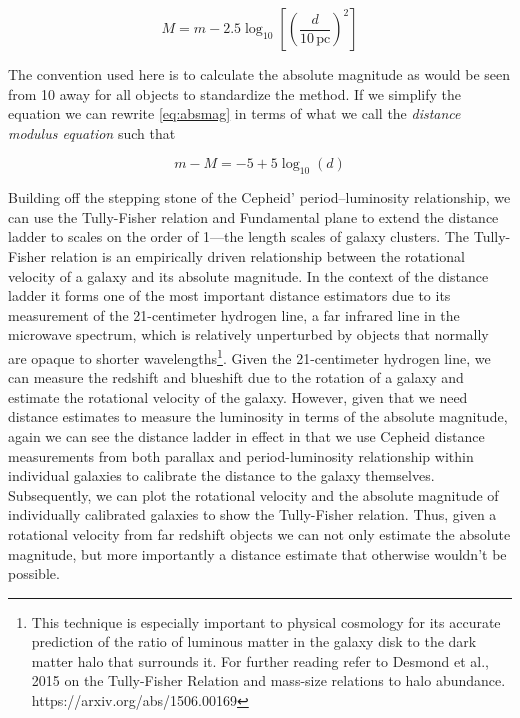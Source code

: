 \begin{equation}M = m - 2.5 \log_{10} \left[ \left( \frac{d}{10\, \text{pc}} \right)^2 \right] \label{eq:absmag}\end{equation}

The convention used here is to calculate the absolute magnitude as would
be seen from 10\si{\parsec} away for all objects to standardize the
method. If we simplify the equation we can rewrite
\cref{eq:absmag} in terms of what we call the
\emph{distance modulus equation} such that

\begin{equation}m - M = -5 + 5  \log_{10} (d)\label{eq:distmod}\end{equation}

Building off the stepping stone of the Cepheid' period--luminosity
relationship, we can use the Tully-Fisher relation and Fundamental plane
to extend the distance ladder to scales on the order of
1\si{\Gigaparsec}---the length scales of galaxy clusters. The
Tully-Fisher relation is an empirically driven relationship between the
rotational velocity of a galaxy and its absolute magnitude. In the
context of the distance ladder it forms one of the most important
distance estimators due to its measurement of the 21-centimeter hydrogen
line, a far infrared line in the microwave spectrum, which is relatively
unperturbed by objects that normally are opaque to shorter
wavelengths\footnote{This technique is especially important to physical cosmology for its accurate prediction of the ratio of luminous matter in the galaxy disk to the dark matter halo that surrounds it. For further reading refer to Desmond et al., 2015 on the Tully-Fisher Relation and mass-size relations to halo abundance. https://arxiv.org/abs/1506.00169}.
Given the 21-centimeter hydrogen line, we can measure the redshift and
blueshift due to the rotation of a galaxy and estimate the rotational
velocity of the galaxy. However, given that we need distance estimates
to measure the luminosity in terms of the absolute magnitude, again we
can see the distance ladder in effect in that we use Cepheid distance
measurements from both parallax and period-luminosity relationship
within individual galaxies to calibrate the distance to the galaxy
themselves. Subsequently, we can plot the rotational velocity and the
absolute magnitude of individually calibrated galaxies to show the
Tully-Fisher relation. Thus, given a rotational velocity from far
redshift objects we can not only estimate the absolute magnitude, but
more importantly a distance estimate that otherwise wouldn't be
possible.

